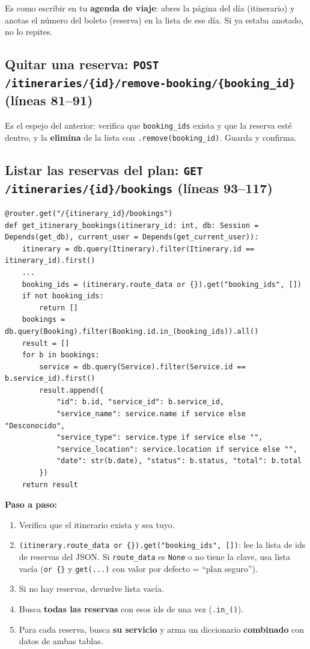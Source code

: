 \documentclass[11pt,a4paper]{article}
\begin{document}
\begin{analogia}
Es como escribir en tu \textbf{agenda de viaje}: abres la página del día (itinerario) y
anotas el número del boleto (reserva) en la lista de ese día. Si ya estaba anotado, no lo repites.
\end{analogia}

\subsection{Quitar una reserva: \texttt{POST /itineraries/\{id\}/remove-booking/\{booking\_id\}} (líneas 81--91)}

Es el espejo del anterior: verifica que \texttt{booking\_ids} exista y que la reserva esté
dentro, y la \textbf{elimina} de la lista con \texttt{.remove(booking\_id)}. Guarda y confirma.

\subsection{Listar las reservas del plan: \texttt{GET /itineraries/\{id\}/bookings} (líneas 93--117)}

\begin{lstlisting}
@router.get("/{itinerary_id}/bookings")
def get_itinerary_bookings(itinerary_id: int, db: Session = Depends(get_db), current_user = Depends(get_current_user)):
    itinerary = db.query(Itinerary).filter(Itinerary.id == itinerary_id).first()
    ...
    booking_ids = (itinerary.route_data or {}).get("booking_ids", [])
    if not booking_ids:
        return []
    bookings = db.query(Booking).filter(Booking.id.in_(booking_ids)).all()
    result = []
    for b in bookings:
        service = db.query(Service).filter(Service.id == b.service_id).first()
        result.append({
            "id": b.id, "service_id": b.service_id,
            "service_name": service.name if service else "Desconocido",
            "service_type": service.type if service else "",
            "service_location": service.location if service else "",
            "date": str(b.date), "status": b.status, "total": b.total
        })
    return result
\end{lstlisting}

\textbf{Paso a paso:}
\begin{enumerate}
    \item Verifica que el itinerario exista y sea tuyo.
    \item \texttt{(itinerary.route\_data or \{\}).get("booking\_ids", [])}: lee la lista de ids
    de reservas del JSON. Si \texttt{route\_data} es \texttt{None} o no tiene la clave, usa
    lista vacía (\texttt{or \{\}} y \texttt{get(...)} con valor por defecto = ``plan seguro'').
    \item Si no hay reservas, devuelve lista vacía.
    \item Busca \textbf{todas las reservas} con esos ids de una vez (\texttt{.in\_()}).
    \item Para cada reserva, busca \textbf{su servicio} y arma un diccionario \textbf{combinado}
    con datos de ambas tablas.
\end{enumerate}
\end{document}
